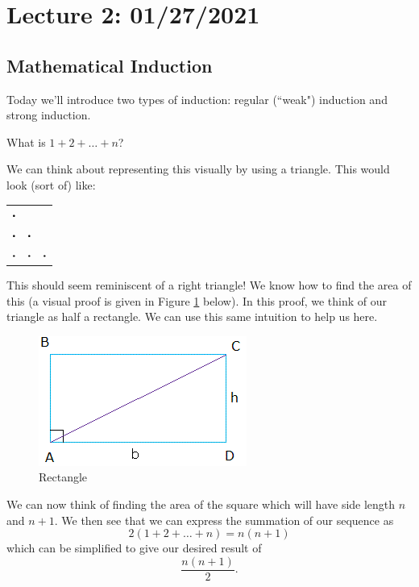 \section{Lecture 2: 01/27/2021}

\subsection{Mathematical Induction}

Today we'll introduce two types of induction: regular (``weak") induction and strong induction.

\begin{example}
What is $1 + 2 + \dots + n$?
\end{example}

We can think about representing this visually by using a triangle. This would look (sort of) like:
\begin{table}[h]
    \centering
    \begin{tabular}{c c c}
        $\bigcdot$ & & \\
        $\bigcdot$ & $\bigcdot$ & \\
        $\bigcdot$ & $\bigcdot$ & $\bigcdot$\\
    \end{tabular}
\end{table}

This should seem reminiscent of a right triangle! We know how to find the area of this (a visual proof is given in Figure \ref{fig:rect} below). In this proof, we think of our triangle as half a rectangle. We can use this same intuition to help us here. 

\begin{figure}[h]
    \centering
    \includegraphics[scale=.5]{notes/images/rect.png}
    \caption{Rectangle}
    \label{fig:rect}
\end{figure}

We can now think of finding the area of the square which will have side length $n$ and $n+1$. We then see that we can express the summation of our sequence as 
\[
2(1 + 2 + \dots + n) = n(n+1)
\]
which can be simplified to give our desired result of 
$$
\frac{n(n+1)}{2}.
$$


